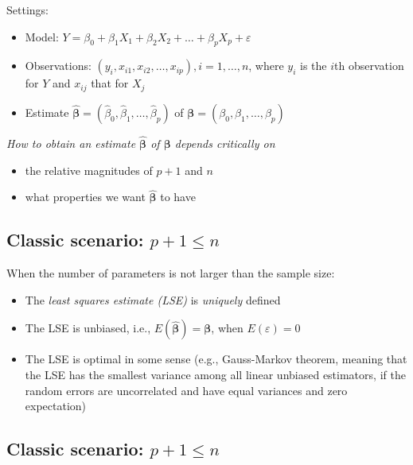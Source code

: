 \documentclass[]{article}
\providecommand{\tightlist}{%
  \setlength{\itemsep}{0pt}\setlength{\parskip}{0pt}}
\begin{document}
Settings:

\begin{itemize}
\item
  Model:
  \(Y=\beta_0+\beta_1 X_1 + \beta_2 X_2 + \ldots + \beta_p X_p + \varepsilon\)
\item
  Observations: \((y_i,x_{i1},x_{i2},\ldots,x_{ip}),i=1,\ldots,n\),
  where \(y_i\) is the \(i\)th observation for \(Y\) and \(x_{ij}\) that
  for \(X_j\)
\item
  Estimate
  \(\hat{\boldsymbol{\beta}}=(\hat{\beta}_0,\hat{\beta}_1,\ldots,\hat{\beta}_p)\)
  of \({\boldsymbol{\beta}}=({\beta}_0,{\beta}_1,\ldots,{\beta}_p)\)
\end{itemize}

\emph{How to obtain an estimate \(\hat{\boldsymbol{\beta}}\) of
\({\boldsymbol{\beta}}\) depends critically on}

\begin{itemize}
\tightlist
\item
  the relative magnitudes of \(p+1\) and \(n\)
\item
  what properties we want \(\hat{\boldsymbol{\beta}}\) to have
\end{itemize}

\subsection{\texorpdfstring{Classic scenario:
\(p+1 \le n\)}{Classic scenario: p+1 \textbackslash{}le n}}\label{classic-scenario-p1-le-n}

When the number of parameters is not larger than the sample size:

\begin{itemize}
\tightlist
\item
  The \emph{least squares estimate (LSE)} is \emph{uniquely} defined
\item
  The LSE is unbiased, i.e.,
  \(E(\hat{\boldsymbol{\beta}})={\boldsymbol{\beta}}\), when
  \(E(\varepsilon)=0\)
\item
  The LSE is optimal in some sense (e.g., Gauss-Markov theorem, meaning
  that the LSE has the smallest variance among all linear unbiased
  estimators, if the random errors are uncorrelated and have equal
  variances and zero expectation)
\end{itemize}

\subsection{\texorpdfstring{Classic scenario:
\(p+1 \le n\)}{Classic scenario: p+1 \textbackslash{}le n}}\label{classic-scenario-p1-le-n-1}
\end{document}

